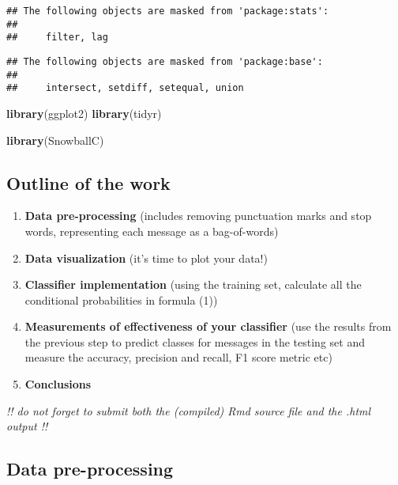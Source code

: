 \documentclass[
]{article}
\newenvironment{Shaded}{\begin{snugshade}}{\end{snugshade}}
\newcommand{\FunctionTok}[1]{\textcolor[rgb]{0.13,0.29,0.53}{\textbf{#1}}}
\newcommand{\NormalTok}[1]{#1}
\providecommand{\tightlist}{%
  \setlength{\itemsep}{0pt}\setlength{\parskip}{0pt}}
\begin{document}
\begin{verbatim}
## The following objects are masked from 'package:stats':
## 
##     filter, lag
\end{verbatim}

\begin{verbatim}
## The following objects are masked from 'package:base':
## 
##     intersect, setdiff, setequal, union
\end{verbatim}

\begin{Shaded}
\begin{Highlighting}[]
\FunctionTok{library}\NormalTok{(ggplot2)}
\FunctionTok{library}\NormalTok{(tidyr)}

\FunctionTok{library}\NormalTok{(SnowballC)}
\end{Highlighting}
\end{Shaded}

\subsection{Outline of the work}\label{outline-of-the-work}

\begin{enumerate}
\def\labelenumi{\arabic{enumi}.}
\tightlist
\item
  \textbf{Data pre-processing} (includes removing punctuation marks and
  stop words, representing each message as a bag-of-words)
\item
  \textbf{Data visualization} (it's time to plot your data!)
\item
  \textbf{Classifier implementation} (using the training set, calculate
  all the conditional probabilities in formula (1))
\item
  \textbf{Measurements of effectiveness of your classifier} (use the
  results from the previous step to predict classes for messages in the
  testing set and measure the accuracy, precision and recall, F1 score
  metric etc)
\item
  \textbf{Conclusions}
\end{enumerate}

\emph{!! do not forget to submit both the (compiled) Rmd source file and
the .html output !!}

\subsection{Data pre-processing}\label{data-pre-processing}
\end{document}
